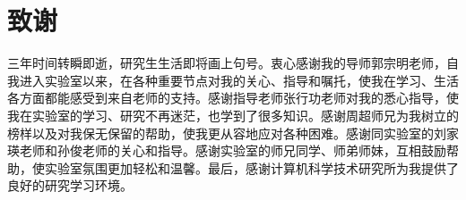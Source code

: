 %
%


%
%
\renewcommand{\baselinestretch}{1.5}
\fontsize{12pt}{13pt}\selectfont

\chapter*{致谢}
{}

三年时间转瞬即逝，研究生生活即将画上句号。衷心感谢我的导师郭宗明老师，自我进入实验室以来，在各种重要节点对我的关心、指导和嘱托，使我在学习、生活各方面都能感受到来自老师的支持。感谢指导老师张行功老师对我的悉心指导，使我在实验室的学习、研究不再迷茫，也学到了很多知识。感谢周超师兄为我树立的榜样以及对我保无保留的帮助，使我更从容地应对各种困难。感谢同实验室的刘家瑛老师和孙俊老师的关心和指导。感谢实验室的师兄同学、师弟师妹，互相鼓励帮助，使实验室氛围更加轻松和温馨。最后，感谢计算机科学技术研究所为我提供了良好的研究学习环境。